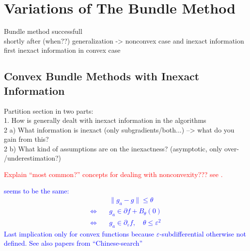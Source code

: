 \section{Variations of The Bundle Method}

Bundle method successfull \\
shortly after (when??) generalization -> nonconvex case and inexact information \\
first inexact information in convex case

\subsection{Convex Bundle Methods with Inexact Information}


Partition section in two parts: \\
1. How is generally dealt with inexact information in the algorithms \\
2 a) What information is inexact (only subgradients/both...) --> what do you gain from this? \\
2 b) What kind of assumptions are on the inexactness? (asymptotic, only over- /underestimation?)

\textcolor{red}{Explain ``most common?'' concepts for dealing with nonconvexity??? see \cite{Mifflin1982}.}



\textcolor{blue}{seems to be the same:
\begin{align}
	& \|g_a-g\| \leq \theta \\
	\Leftrightarrow \quad & g_a \in \partial f + B_\theta(0) \\
	\Leftrightarrow \quad & g_a \in \partial_{\varepsilon}f, \quad \theta \leq \varepsilon^2
\end{align}
Last implication only for convex functions because \(\varepsilon\)-subdifferential otherwise not defined.
See also papers from ``Chinese-search''} \\

